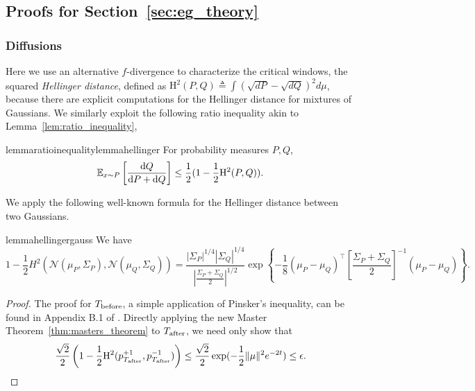 \subsection{Proofs for Section~\ref{sec:eg_theory}}\label{app:eg_theory}
\subsubsection{Diffusions}
Here we use an alternative $f$-divergence to characterize the critical windows, the squared \emph{Hellinger distance}, defined as $\mathrm{H}^2(P,Q) \triangleq \int(\sqrt{dP}-\sqrt{dQ})^2 d\mu$, because there are explicit computations for the Hellinger distance for mixtures of Gaussians. We similarly exploit the following ratio inequality akin to Lemma~\ref{lem:ratio_inequality}, 
\begin{restatable}{lemma}{ratioinequalitylemmahellinger}\label{lem:ratio_inequality_hellinger}
For probability measures $P,Q$, 
\begin{align*}
\mathbb{E}_{x \sim P} \left[\frac{\mathrm{d} Q}{\mathrm{d} P+\mathrm{d} Q} \right]
\le \frac{1}{2}(1-\frac{1}{2}\mathrm{H}^2(P,Q)).
\end{align*}
\end{restatable}
We apply the following well-known formula for the Hellinger distance between two Gaussians.  
\begin{restatable}{lemma}{hellingergauss}\label{lem:hellingergauss}
We have 
$$
1-\frac{1}{2}H^2(\mathcal{N}(\mu_P,\Sigma_P),\mathcal{N}(\mu_Q,\Sigma_Q))= \frac{|\Sigma_P|^{1/4}|\Sigma_Q|^{1/4}}{\left|\frac{\Sigma_P+\Sigma_Q}{2}\right|^{1/2}} \exp \left\{-\frac{1}{8}(\mu_P-\mu_Q)^\top \left[\frac{\Sigma_P+\Sigma_Q}{2}\right]^{-1}(\mu_P-\mu_Q)\right\}.
$$
\end{restatable}
\diffusiontwogaussian*
\begin{proof}
The proof for $T_{\mathrm{before}}$, a simple application of Pinsker's inequality, can be found in Appendix B.1 of \citep{li2024criticalwindowsnonasymptotictheory}. Directly applying the new Master Theorem~\ref{thm:masters_theorem} to $T_{\mathrm{after}}$, we need only show that 
\begin{align*}
\frac{\sqrt{2}}{2} \left(1-\frac{1}{2}\mathrm{H}^2(p^{+1}_{T_{\mathrm{after}}},p^{-1}_{T_{\mathrm{after}}})\right) \leq \frac{\sqrt{2}}{2} \exp(-\frac{1}{2}\|\mu\|^2e^{-2t})\leq \epsilon.
\end{align*}
\end{proof}

